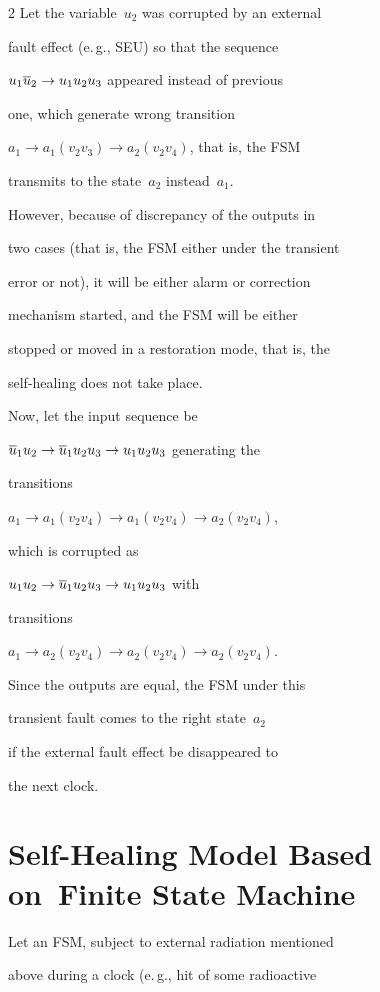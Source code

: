 \begin{multicols}{2}
Let the variable~$u_2$ was corrupted by an external

fault effect (e.\,g., SEU) so that the sequence

$u_1\overline u_2\to u_1u_2u_3$ appeared instead of previous

one, which generate wrong transition

$a_1\to a_1(v_2v_3)\to a_2(v_2v_4)$, that is, the FSM

transmits to the state~$a_2$ instead~$a_1$.

However, because of discrepancy of the outputs in

two cases (that is, the FSM either under the transient

error or not), it will be  either alarm or correction

mechanism  started, and the FSM will be either

stopped or moved in a restoration mode, that is, the

self-healing does not take place.

Now, let the input sequence be

$\overline u_1u_2\to \overline u_1u_2u_3\to u_1u_2u_3$ generating the

transitions

$a_1\to a_1(v_2v_4)\to a_1(v_2v_4)\to a_2(v_2v_4)$,

which is corrupted as

$u_1u_2\to \overline u_1u_2u_3\to u_1u_2u_3$ with

transitions

$a_1\to a_2(v_2v_4)\to a_2(v_2v_4)\to a_2(v_2v_4)$.

Since the outputs are equal, the FSM under this

transient fault comes to the right state~$a_2$

if the external fault effect be disappeared to

the next clock.




\section{Self-Healing Model Based on~Finite State Machine}



\noindent

Let an FSM, subject to external radiation mentioned

above during a clock (e.\,g., hit of some radioactive


\end{multicols}

